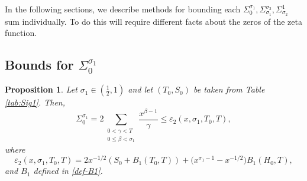 \documentclass[10pt]{amsart}
\newtheorem{prop}{Proposition}[section]
\theoremstyle{definition}
\numberwithin{equation}{section}
\begin{document}
In the following sections, we describe methods for bounding each $ \Sigma_{0}^{\sigma_1}, \Sigma_{\sigma_1}^{\sigma_2}, \Sigma_{\sigma_2}^1$ sum individually.
To do this will require different facts about the zeros of the zeta function.

\subsection{Bounds for $\Sigma_{0}^{\sigma_1}$}

\begin{prop}\label{bnd-Sigma-0-sigma1}
Let $\sigma_1 \in (\frac{1}{2}, 1)$ and let $(T_0,S_0)$ be taken from Table \ref{tab:Sig1}.
 Then,
\begin{equation}
\Sigma_0^{\sigma_1} = 2\sum_{\substack{0<\gamma<T \\ 0 \le \beta <  \sigma_1}} \frac{x^{\beta-1}}{\gamma}
\le  \varepsilon_2(x, \sigma_1, T_0, T),
\end{equation}
where 
\begin{equation}\label{def-epsilon2}
\varepsilon_2(x, \sigma_1, T_0, T) =  2 x^{-1/2} (S_0 + B_1(T_0,T))
+ \Big( x^{\sigma_1-1} - x^{-1/2} \Big)B_1(H_0, T),
\end{equation}
and $B_1$ defined in \eqref{def-B1}.
\end{prop}
\end{document}
